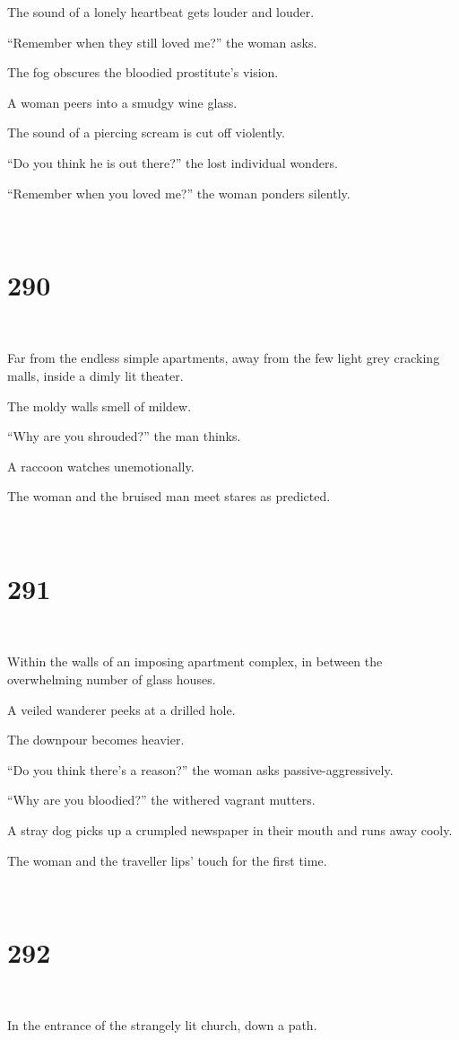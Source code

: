 \documentclass{report}
\begin{document}
The sound of a lonely heartbeat gets louder and louder.

``Remember when they still loved me?'' the woman asks.

The fog obscures the bloodied prostitute's vision.

A woman peers into a smudgy wine glass.

The sound of a piercing scream is cut off violently.

``Do you think he is out there?'' the lost individual wonders.

``Remember when you loved me?'' the woman ponders silently.

~
\chapter*{290}
~

Far from the endless simple apartments, away from the few light grey cracking malls, inside a dimly lit theater.

The moldy walls smell of mildew.

``Why are you shrouded?'' the man thinks.

A raccoon watches unemotionally.

The woman and the bruised man meet stares as predicted.

~
\chapter*{291}
~

Within the walls of an imposing apartment complex, in between the overwhelming number of glass houses.

A veiled wanderer peeks at a drilled hole.

The downpour becomes heavier.

``Do you think there's a reason?'' the woman asks passive-aggressively.

``Why are you bloodied?'' the withered vagrant mutters.

A stray dog picks up a crumpled newspaper in their mouth and runs away cooly.

The woman and the traveller lips' touch for the first time.

~
\chapter*{292}
~

In the entrance of the strangely lit church, down a path.
\end{document}
